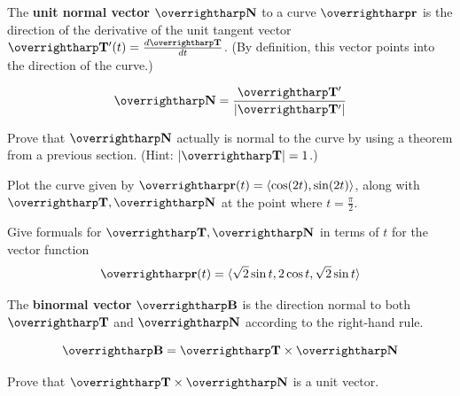 \documentclass[letterpaper, twoside, 12pt]{book}
\begin{document}
\begin{definition}
  The \textbf{unit normal vector} $\vect{N}$ to a curve $\vect{r}$ is the
  direction of the derivative of the unit tangent vector
  $\vect{T}'(t)=\frac{d\vect{T}}{dt}$.
  (By definition, this vector points into the direction of the curve.)
\end{definition}

\begin{theorem}
  \[
    \vect{N} = \frac{\vect{T}'}{|\vect{T}'|}
  \]
\end{theorem}

          \begin{problem}
            Prove that $\vect{N}$ actually is normal to the curve by
            using a theorem from a previous section. (Hint: $|\vect{T}|=1$.)
          \end{problem}

          \begin{solution}

          \end{solution}

          \begin{problem}
            Plot the curve given by $\vect{r}(t)=\<\cos(2t),\sin(2t)\>$,
            along with $\vect{T},\vect{N}$ at the point where
            $t=\frac{\pi}{2}$.
          \end{problem}

          \begin{problem}
            Give formuals for $\vect{T},\vect{N}$ in terms of $t$ for
            the vector function
            \[\vect{r}(t) = \< \sqrt{2}\sin t,2\cos t,\sqrt{2}\sin t \>\]
          \end{problem}

          \begin{solution}

          \end{solution}

\begin{definition}
  The \textbf{binormal vector} $\harpvec{B}$ is the direction
  normal to both $\harpvec{T}$ and $\harpvec{N}$ according to
  the right-hand rule.
\end{definition}

\begin{theorem}
  \[
    \vect{B}=\vect{T}\times\vect{N}
  \]
\end{theorem}

          \begin{problem}
            Prove that $\vect{T}\times\vect{N}$ is a unit vector.
          \end{problem}
\end{document}

